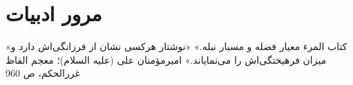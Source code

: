 \chapter{مرور ادبیات}
\label{ch3}
\bottomquote
{«کتاب المرء معیار فضله و مسبار نبله.»}
{«نوشتار هر‌کسی نشان از فرزانگی‌اش دارد و میزان فرهیختگی‌اش را می‌نمایاند.»}
{امیرمؤمنان علی (علیه السلام)؛ معجم الفاظ غررالحکم، ص 960}
\clearpage


%
%
%
%
%
%
%
%


